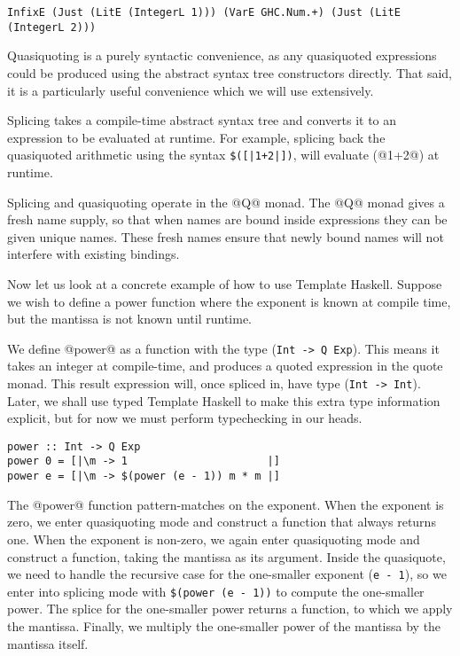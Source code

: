 \begin{lstlisting}
InfixE (Just (LitE (IntegerL 1))) (VarE GHC.Num.+) (Just (LitE (IntegerL 2)))
\end{lstlisting}

Quasiquoting is a purely syntactic convenience, as any quasiquoted expressions could be produced using the abstract syntax tree constructors directly.
That said, it is a particularly useful convenience which we will use extensively.

Splicing takes a compile-time abstract syntax tree and converts it to an expression to be evaluated at runtime.
For example, splicing back the quasiquoted arithmetic using the syntax \lstinline/$([|1+2|])/, will evaluate (@1+2@) at runtime.

Splicing and quasiquoting operate in the @Q@ monad.
The @Q@ monad gives a fresh name supply, so that when names are bound inside expressions they can be given unique names.
These fresh names ensure that newly bound names will not interfere with existing bindings.

Now let us look at a concrete example of how to use Template Haskell.
Suppose we wish to define a power function where the exponent is known at compile time, but the mantissa is not known until runtime.

We define @power@ as a function with the type (\lstinline/Int -> Q Exp/).
This means it takes an integer at compile-time, and produces a quoted expression in the quote monad.
This result expression will, once spliced in, have type (\lstinline/Int -> Int/).
Later, we shall use typed Template Haskell to make this extra type information explicit, but for now we must perform typechecking in our heads.

\begin{lstlisting}
power :: Int -> Q Exp
power 0 = [|\m -> 1                      |]
power e = [|\m -> $(power (e - 1)) m * m |]
\end{lstlisting}

The @power@ function pattern-matches on the exponent.
When the exponent is zero, we enter quasiquoting mode and construct a function that always returns one.
When the exponent is non-zero, we again enter quasiquoting mode and construct a function, taking the mantissa as its argument.
Inside the quasiquote, we need to handle the recursive case for the one-smaller exponent (\lstinline/e - 1/), so we enter into splicing mode with \lstinline/$(power (e - 1))/ to compute the one-smaller power.
The splice for the one-smaller power returns a function, to which we apply the mantissa.
Finally, we multiply the one-smaller power of the mantissa by the mantissa itself.

